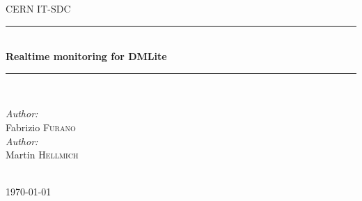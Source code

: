 \documentclass[12pt]{article} %
\begin{document}

\begin{titlepage}

\newcommand{\HRule}{\rule{\linewidth}{0.5mm}} %

\center %

\textsc{\LARGE CERN IT-SDC}\\[1.5cm] %

\HRule \\[0.4cm]
{\huge \bfseries Realtime monitoring for DMLite}\\[0.4cm] %
\HRule \\[1.5cm]

\begin{minipage}{0.4\textwidth}
\begin{flushleft} \large
\emph{Author:}\\
Fabrizio \textsc{Furano} \\ %
\emph{Author:}\\
Martin \textsc{Hellmich} \\ %
\end{flushleft}
\end{minipage}
\\[1cm]

{\large \today}\\[3cm] %




\vfill %

\end{titlepage}
\end{document}
